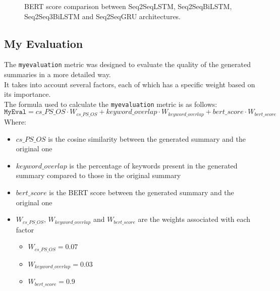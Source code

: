 \begin{figure}[H]
    \centering
    \hfill
    \hfill
    \hfill
    \hfill

    \caption{BERT score comparison between Seq2SeqLSTM, Seq2SeqBiLSTM, Seq2Seq3BiLSTM and Seq2SeqGRU architectures.}
    \label{fig:bert_score_comparison}
\end{figure}

\subsection{My Evaluation}
The \texttt{myevaluation} metric was designed to evaluate the quality of the generated summaries in a more detailed way.\\
It takes into account several factors, each of which has a specific weight based on its importance.\\
The formula used to calculate the \texttt{myevaluation} metric is as follows:
\[
    \texttt{MyEval} = cs\_PS\_OS \cdot W_{cs\_PS\_OS} + keyword\_overlap \cdot W_{keyword\_overlap} + bert\_score \cdot W_{bert\_score}
\]
Where:
\begin{itemize}
    \item $cs\_PS\_OS$ is the cosine similarity between the generated summary and the original one
    \item $keyword\_overlap$ is the percentage of keywords present in the generated summary compared to those in the original summary
    \item $bert\_score$ is the BERT score between the generated summary and the original one
    \item $W_{cs\_PS\_OS}$, $W_{keyword\_overlap}$ and $W_{bert\_score}$ are the weights associated with each factor
          \begin{itemize}
              \item $W_{cs\_PS\_OS} = 0.07$
              \item $W_{keyword\_overlap} = 0.03$
              \item $W_{bert\_score} = 0.9$
          \end{itemize}
\end{itemize}

